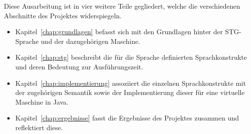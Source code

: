 Diese Ausarbeitung ist in vier weitere Teile gegliedert, welche die verschiedenen Abschnitte des Projektes widerspiegeln.

\begin{itemize}
\item Kapitel~\ref{chap:grundlagen} befasst sich mit den Grundlagen hinter der STG-Sprache und der dazugehörigen Maschine.

\item Kapitel~\ref{chap:stg} beschreibt die für die Sprache definierten Sprachkonstrukte und deren Bedeutung zur Ausführungszeit.

\item Kapitel~\ref{chap:implementierung} assoziiert die einzelnen Sprachkonstrukte mit der zugehörigen Semantik sowie der Implementierung dieser für eine virtuelle Maschine in Java.

\item Kapitel~\ref{chap:ergebnisse} fasst die Ergebnisse des Projektes zusammen und reflektiert diese.

\end{itemize}



